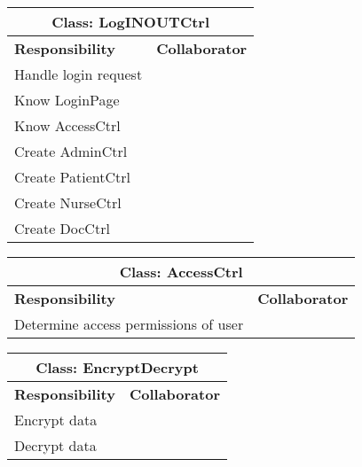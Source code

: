 \documentclass[12pt]{article}
\begin{document}
\begin{center}
\begin{tabularx}{\textwidth}{|X|r|} \hline
\multicolumn{2}{|c|}{\textbf{Class: LogINOUTCtrl}}\\ \hline
\textbf{Responsibility} & \textbf{Collaborator} \\ \hline
Handle login request  & \\ \hline
Know LoginPage  & \\ \hline
Know AccessCtrl  & \\ \hline
Create AdminCtrl  & \\ \hline
Create PatientCtrl  & \\ \hline
Create NurseCtrl  & \\ \hline
Create DocCtrl  & \\ \hline
\end{tabularx}
\newline\newline
\end{center}

\begin{center}
\begin{tabularx}{\textwidth}{|X|r|} \hline
\multicolumn{2}{|c|}{\textbf{Class: AccessCtrl}}\\ \hline
\textbf{Responsibility} & \textbf{Collaborator} \\ \hline
Determine access permissions of user & \\ \hline
\end{tabularx}
\newline\newline
\end{center}
\begin{center}
\begin{tabularx}{\textwidth}{|X|r|} \hline
\multicolumn{2}{|c|}{\textbf{Class: EncryptDecrypt}}\\ \hline
\textbf{Responsibility} & \textbf{Collaborator} \\ \hline
Encrypt data & \\ \hline
Decrypt data & \\ \hline
\end{tabularx}
\newline\newline
\end{center}
\end{document}
